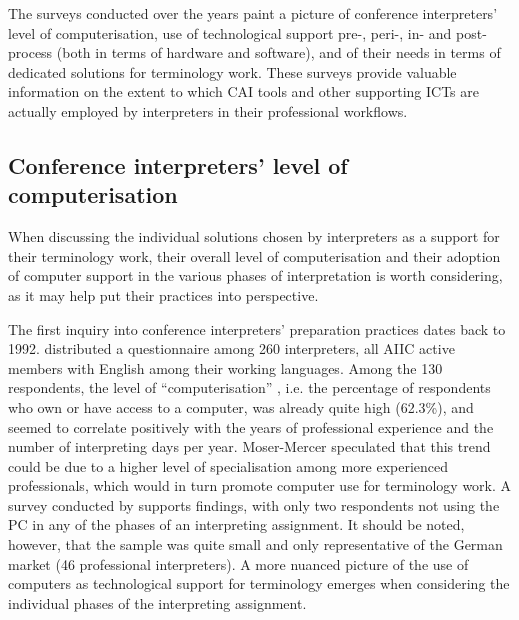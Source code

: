 The surveys conducted over the years paint a picture of conference interpreters' level of computerisation, use of technological support pre-, peri-, in- and post-process (both in terms of hardware and software), and of their needs in terms of dedicated solutions for terminology work. These surveys provide valuable information on the extent to which CAI tools and other supporting ICTs are actually employed by interpreters in their professional workflows.

\subsection{Conference interpreters' level of computerisation} \label{computerisation}\largerpage
When discussing the individual solutions chosen by interpreters as a support for their terminology work, their overall level of computerisation and their adoption of computer support in the various phases of interpretation is worth considering, as it may help put their practices into perspective.

The first inquiry into conference interpreters' preparation practices dates back to 1992. \citet{moser-mercer_banking_1992} distributed a questionnaire among 260 interpreters, all AIIC active members with English among their working languages. Among the 130 respondents, the level of ``computerisation'' \citep[510]{moser-mercer_banking_1992}, i.e. the percentage of respondents who own or have access to a computer, was already quite high (62.3\%), and seemed to correlate positively with the years of professional experience and the number of interpreting days per year. Moser-Mercer speculated that this trend could be due to a higher level of specialisation among more experienced professionals, which would in turn promote computer use for terminology work. A survey conducted by \citet{drechsel_computereinsatz_2004} supports  findings, with only two respondents not using the PC in any of the phases of an interpreting assignment. It should be noted, however, that the sample was quite small and only representative of the German market (46 professional interpreters). A more nuanced picture of the use of computers as technological support for terminology emerges when considering the individual phases of the interpreting assignment.

